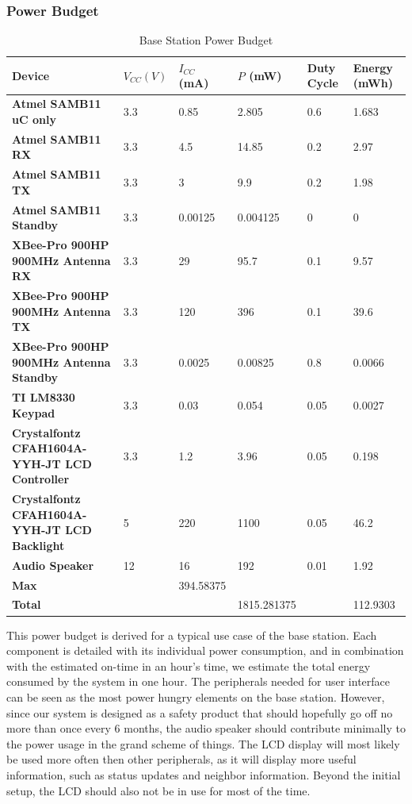 \documentclass[journal,compsoc]{IEEEtran}
\begin{document}
\subsubsection{Power Budget}

\begin{table}[t]
  \centering
  \begin{tabular}{>{\bfseries}l|l l l l l}
    Device & $V_{CC} (V)$ & $I_{CC}$ (mA) & $P$ (mW) & Duty Cycle & Energy (mWh) \\
    \hline
    Atmel SAMB11 uC only & 3.3 & 0.85 & 2.805 & 0.6 & 1.683 \\
    Atmel SAMB11 RX & 3.3 & 4.5 & 14.85 & 0.2 & 2.97 \\
    Atmel SAMB11 TX & 3.3 & 3 & 9.9 & 0.2 & 1.98 \\
    Atmel SAMB11 Standby & 3.3 & 0.00125 & 0.004125 & 0 & 0 \\
    XBee-Pro 900HP 900MHz Antenna RX & 3.3 & 29 & 95.7 & 0.1 & 9.57 \\
    XBee-Pro 900HP 900MHz Antenna TX & 3.3 & 120 & 396 & 0.1 & 39.6 \\
    XBee-Pro 900HP 900MHz Antenna Standby & 3.3 & 0.0025 & 0.00825 & 0.8 & 0.0066 \\
    TI LM8330 Keypad & 3.3 & 0.03 & 0.054 & 0.05 & 0.0027 \\
    Crystalfontz CFAH1604A-YYH-JT LCD Controller & 3.3 & 1.2 & 3.96 & 0.05 & 0.198 \\
    Crystalfontz CFAH1604A-YYH-JT LCD Backlight & 5 & 220 & 1100 & 0.05 & 46.2 \\
    Audio Speaker & 12 & 16 & 192 & 0.01 & 1.92 \\
    \hline
    Max & & 394.58375 & & & \\
    Total & & & 1815.281375 & & 112.9303
  \end{tabular}
  \caption{Base Station Power Budget}
\end{table}

This power budget is derived for a typical use case of the base station.  Each component is detailed with its individual power consumption, and in combination with the estimated on-time in an hour’s time, we estimate the total energy consumed by the system in one hour.  The peripherals needed for user interface can be seen as the most power hungry elements on the base station.  However, since our system is designed as a safety product that should hopefully go off no more than once every 6 months, the audio speaker should contribute minimally to the power usage in the grand scheme of things.  The LCD display will most likely be used more often then other peripherals, as it will display more useful information, such as status updates and neighbor information.  Beyond the initial setup, the LCD should also not be in use for most of the time.
\end{document}
